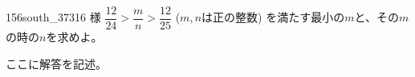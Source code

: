 \begin{thm}{156}{}{south\_37316 様}
 $\dfrac{12}{24}>\dfrac{m}{n}>\dfrac{12}{25}$ ($m, n$は正の整数) を満たす最小の$m$と、その$m$の時の$n$を求めよ。
\end{thm}

ここに解答を記述。